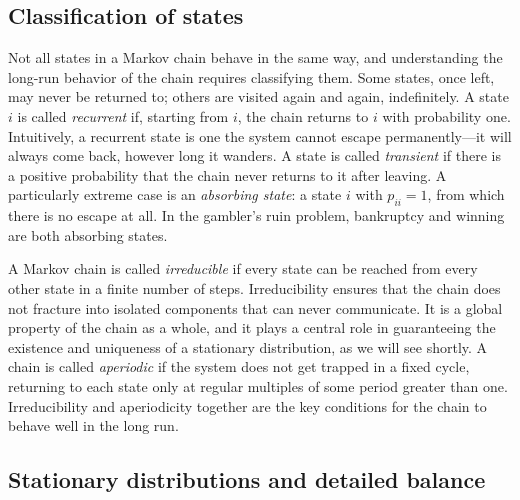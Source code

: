 \subsection*{Classification of states}

Not all states in a Markov chain behave in the same way, and understanding the long-run behavior of the chain requires classifying them. Some states, once left, may never be returned to; others are visited again and again, indefinitely. A state $i$ is called \textit{recurrent} if, starting from $i$, the chain returns to $i$ with probability one. Intuitively, a recurrent state is one the system cannot escape permanently---it will always come back, however long it wanders. A state is called \textit{transient} if there is a positive probability that the chain never returns to it after leaving. A particularly extreme case is an \textit{absorbing state}: a state $i$ with $p_{ii} = 1$, from which there is no escape at all. In the gambler's ruin problem, bankruptcy and winning are both absorbing states.

\medskip

A Markov chain is called \textit{irreducible} if every state can be reached from every other state in a finite number of steps. Irreducibility ensures that the chain does not fracture into isolated components that can never communicate. It is a global property of the chain as a whole, and it plays a central role in guaranteeing the existence and uniqueness of a stationary distribution, as we will see shortly. A chain is called \textit{aperiodic} if the system does not get trapped in a fixed cycle, returning to each state only at regular multiples of some period greater than one. Irreducibility and aperiodicity together are the key conditions for the chain to behave well in the long run.

\subsection*{Stationary distributions and detailed balance}

